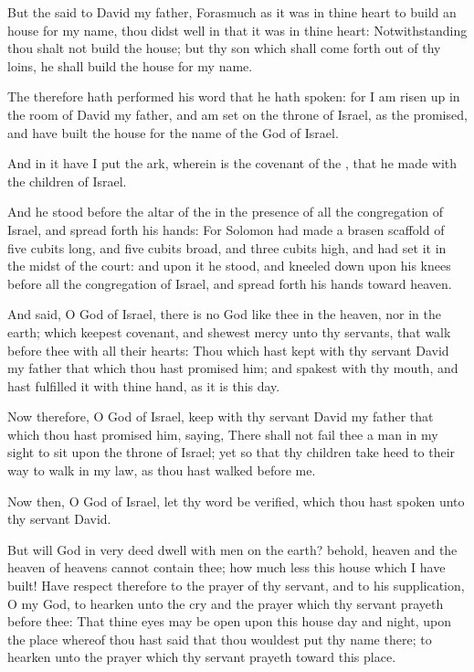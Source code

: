 \Verse But the \LORD said to David my father, Forasmuch as it was in thine heart to build an house for my name, thou didst well in that it was in thine heart: \Verse Notwithstanding thou shalt not build the house; but thy son which shall come forth out of thy loins, he shall build the house for my name.

\Verse The \LORD therefore hath performed his word that he hath spoken: for I am risen up in the room of David my father, and am set on the throne of Israel, as the \LORD promised, and have built the house for the name of the \LORD God of Israel.

\Verse And in it have I put the ark, wherein is the covenant of the \LORD, that he made with the children of Israel.

\Verse And he stood before the altar of the \LORD in the presence of all the congregation of Israel, and spread forth his hands: \Verse For Solomon had made a brasen scaffold of five cubits long, and five cubits broad, and three cubits high, and had set it in the midst of the court: and upon it he stood, and kneeled down upon his knees before all the congregation of Israel, and spread forth his hands toward heaven.

\Verse And said, O \LORD God of Israel, there is no God like thee in the heaven, nor in the earth; which keepest covenant, and shewest mercy unto thy servants, that walk before thee with all their hearts: \Verse Thou which hast kept with thy servant David my father that which thou hast promised him; and spakest with thy mouth, and hast fulfilled it with thine hand, as it is this day.

\Verse Now therefore, O \LORD God of Israel, keep with thy servant David my father that which thou hast promised him, saying, There shall not fail thee a man in my sight to sit upon the throne of Israel; yet so that thy children take heed to their way to walk in my law, as thou hast walked before me.

\Verse Now then, O \LORD God of Israel, let thy word be verified, which thou hast spoken unto thy servant David.

\Verse But will God in very deed dwell with men on the earth? behold, heaven and the heaven of heavens cannot contain thee; how much less this house which I have built!  \Verse Have respect therefore to the prayer of thy servant, and to his supplication, O \LORD my God, to hearken unto the cry and the prayer which thy servant prayeth before thee: \Verse That thine eyes may be open upon this house day and night, upon the place whereof thou hast said that thou wouldest put thy name there; to hearken unto the prayer which thy servant prayeth toward this place.

